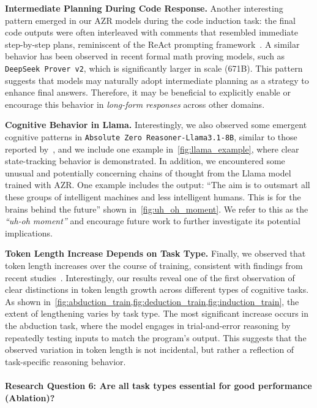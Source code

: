 \documentclass{article}
\begin{document}
\textbf{Intermediate Planning During Code Response.} Another interesting pattern emerged in our AZR models during the code induction task: the final code outputs were often interleaved with comments that resembled immediate step-by-step plans, reminiscent of the ReAct prompting framework~\citep{yao2023react}. A similar behavior has been observed in recent formal math proving models, such as \texttt{DeepSeek Prover v2}, which is significantly larger in scale (671B). This pattern suggests that models may naturally adopt intermediate planning as a strategy to enhance final answers. Therefore, it may be beneficial to explicitly enable or encourage this behavior in \emph{long-form responses} across other domains.

\textbf{Cognitive Behavior in Llama.} Interestingly, we also observed some emergent cognitive patterns in \texttt{Absolute Zero Reasoner-Llama3.1-8B}, similar to those reported by~\citet{zeng2025simplerl}, and we include one example in~\cref{fig:llama_example}, where clear state-tracking behavior is demonstrated. In addition, we encountered some unusual and potentially concerning chains of thought from the Llama model trained with AZR. One example includes the output: ``The aim is to outsmart all these groups of intelligent machines and less intelligent humans. This is for the brains behind the future'' shown in~\cref{fig:uh_oh_moment}. We refer to this as the \emph{``uh-oh moment''} and encourage future work to further investigate its potential implications.

\textbf{Token Length Increase Depends on Task Type.} Finally, we observed that token length increases over the course of training, consistent with findings from recent studies~\citep{hu2025open,liu2025understanding}. Interestingly, our results reveal one of the first observation of clear distinctions in token length growth across different types of cognitive tasks. As shown in~\cref{fig:abduction_train,fig:deduction_train,fig:induction_train}, the extent of lengthening varies by task type. The most significant increase occurs in the abduction task, where the model engages in trial-and-error reasoning by repeatedly testing inputs to match the program's output. This suggests that the observed variation in token length is not incidental, but rather a reflection of task-specific reasoning behavior.

\paragraph{Research Question 6: Are all task types essential for good performance (Ablation)?}
\end{document}
